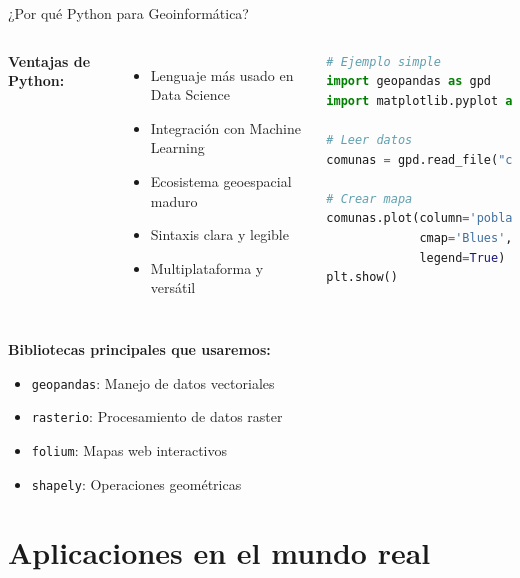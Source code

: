 \documentclass[10pt]{beamer}
\begin{document}
\begin{frame}[fragile]{¿Por qué Python para Geoinformática?}
    \begin{columns}
        \textbf{Ventajas de Python:}
        \begin{itemize}
            \item Lenguaje más usado en Data Science
            \item Integración con Machine Learning
            \item Ecosistema geoespacial maduro
            \item Sintaxis clara y legible
            \item Multiplataforma y versátil
        \end{itemize}
        
        \begin{lstlisting}[language=Python]
# Ejemplo simple
import geopandas as gpd
import matplotlib.pyplot as plt

# Leer datos
comunas = gpd.read_file("comunas.shp")

# Crear mapa
comunas.plot(column='poblacion',
             cmap='Blues',
             legend=True)
plt.show()
        \end{lstlisting}
    \end{columns}
    
    \vspace{0.3cm}
    \textbf{Bibliotecas principales que usaremos:}
    \begin{itemize}
        \item \texttt{geopandas}: Manejo de datos vectoriales
        \item \texttt{rasterio}: Procesamiento de datos raster
        \item \texttt{folium}: Mapas web interactivos
        \item \texttt{shapely}: Operaciones geométricas
    \end{itemize}
\end{frame}

\section{Aplicaciones en el mundo real}
\end{document}
